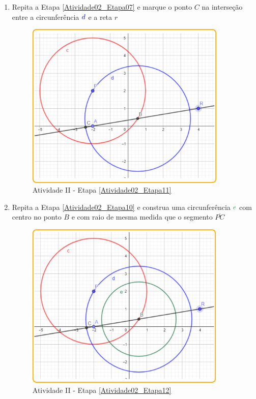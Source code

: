 \documentclass[11pt,a4paper]{article}
\begin{document}
\begin{enumerate}[{Etapa} 1.]
\item Repita a Etapa \ref{Atividade02_Etapa07} e marque o ponto $C$ na interseção entre a circunferência ${\color{blue}{d}}$  e a reta $r$ \label{Atividade02_Etapa11}
\begin{figure}[H]
    \centering
    \includegraphics[height=8cm]{Figuras/T01_Atividade02_Fig06.png}
    \caption{Atividade II - Etapa \ref{Atividade02_Etapa11}}
    \label{Atividade02_Etapa11_Imagem}
\end{figure}

\item Repita a Etapa \ref{Atividade02_Etapa10} e construa uma circunferência ${\color{ForestGreen}{e}}$ com centro no ponto $B$ e com raio de mesma medida que o segmento $\overline{PC}$ \label{Atividade02_Etapa12}
\begin{figure}[H]
    \centering
    \includegraphics[height=8cm]{Figuras/T01_Atividade02_Fig07.png}
    \caption{Atividade II - Etapa \ref{Atividade02_Etapa12}}
    \label{Atividade02_Etapa12_Imagem}
\end{figure}


\end{enumerate}
\end{document}
